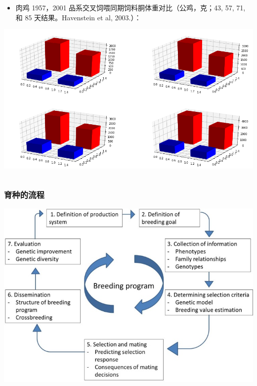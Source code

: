 \documentclass[serif,aspectratio=169]{beamer}
\begin{document}
\begin{frame}
\begin{columns}
    \pause
    \begin{column}{.5\textwidth}
      \begin{itemize}
      \item 肉鸡 1957，2001 品系交叉饲喂同期饲料胴体重对比\tiny{（公鸡，克；43, 57, 71, 和 85 天结果。Havenstein et al, 2003.）}：
      \end{itemize}
      \includegraphics[width=\textwidth]{img/chicken.png}
    \end{column}
  \end{columns}
\end{frame}


\begin{frame}
  \frametitle{育种的流程}
  \centering
  \includegraphics[width=.8\textwidth]{img/Breeding-program.jpg}
\end{frame}
\end{document}
